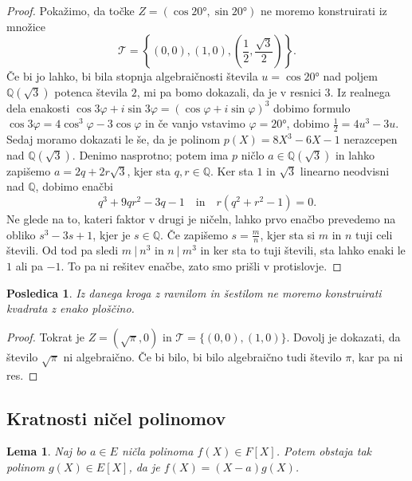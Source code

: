\documentclass[10pt, a4paper]{article}
\newtheorem{posledica}[izr]{Posledica}
\newtheorem{lema}[izr]{Lema}
\newenvironment{noticeC}{%
  \tcolorbox[%
  notitle,
  empty,
  enhanced,  %
  breakable,
  coltext=black, 
  fontupper=\rmfamily,
  parbox=false,
  noparskip,
  sharp corners,
  boxrule=-1pt,  %
  frame hidden,
  left=7pt,  %
  right=7pt,
  top=5pt,
  bottom=5pt,
  before skip=2.5ex plus 2pt,
  after skip=2.5ex plus 2pt,
  overlay unbroken and last={%
  },
  ]}
{\endtcolorbox}
\newenvironment{dokaz}%
  {\begin{noticeC}\begin{proof}}%
  {\end{proof}\end{noticeC}}
\newcommand{\Q}{\mathbb {Q}}
\begin{document}
\begin{dokaz}
  Pokažimo, da točke $Z = (\cos \ang{20}, \sin \ang{20})$ ne moremo konstruirati iz množice 
  $$\mathcal{T} = \left\lbrace (0, 0), (1, 0), \left(\frac{1}{2}, \frac{\sqrt{3}}{2}\right) \right\rbrace.$$ 
  Če bi jo lahko, bi bila stopnja algebraičnosti števila $u = \cos \ang{20}$ nad poljem $\Q (\sqrt{3})$ potenca števila $2$,
  mi pa bomo dokazali, da je v resnici $3$. Iz realnega dela enakosti $\cos 3\varphi + i \sin 3\varphi = (\cos\varphi + i \sin \varphi)^3$
  dobimo formulo $\cos 3 \varphi = 4 \cos^3 \varphi - 3 \cos \varphi$ in če vanjo vstavimo $\varphi = \ang{20}$, 
  dobimo $\frac{1}{2} = 4 u^3 - 3u$. Sedaj moramo dokazati le še, da je polinom $p(X) = 8 X^3 - 6X - 1$ nerazcepen nad $\Q (\sqrt{3})$.
  Denimo nasprotno; potem ima $p$ ničlo $a \in \Q (\sqrt{3})$ in lahko zapišemo $a = 2q + 2r \sqrt{3}$, kjer sta $q, r \in \Q$.
  Ker sta $1$ in $\sqrt{3}$ linearno neodvisni nad $\Q$, dobimo enačbi 
  $$q^3 + 9 qr^2 - 3q - 1 \quad \mathrm{in} \quad r(q^2 + r^2 - 1) = 0.$$
  Ne glede na to, kateri faktor v drugi je ničeln, lahko prvo enačbo prevedemo na obliko $s^3 - 3s + 1$, kjer je $s \in \Q$.
  Če zapišemo $s = \frac{m}{n}$, kjer sta si $m$ in $n$ tuji celi števili. Od tod pa sledi 
  $m\ |\ n^3$ in $n\ |\ m^3$ in ker sta to tuji števili, sta lahko enaki le $1$ ali pa $-1$.
  To pa ni rešitev enačbe, zato smo prišli v protislovje.
\end{dokaz}

\begin{posledica}
  Iz danega kroga z ravnilom in šestilom ne moremo konstruirati kvadrata z enako ploščino.
\end{posledica}

\begin{dokaz}
  Tokrat je $Z = (\sqrt{\pi}, 0)$ in $\mathcal{T} = \{(0, 0), (1, 0)\}$. Dovolj je dokazati, da število $\sqrt{\pi}$
  ni algebraično. Če bi bilo, bi bilo algebraično tudi število $\pi$, kar pa ni res.
\end{dokaz}

\subsection{Kratnosti ničel polinomov}

\begin{lema}
  Naj bo $a \in E$ ničla polinoma $f(X) \in F[X]$. Potem obstaja tak polinom $g(X) \in E[X]$,
  da je $f(X) = (X - a) g(X)$.
\end{lema}
\end{document}
